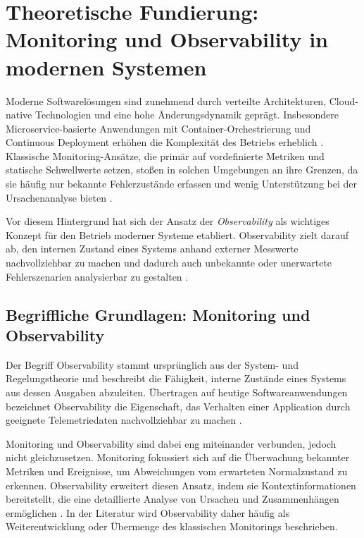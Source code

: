 \section{Theoretische Fundierung: Monitoring und Observability in modernen Systemen}

Moderne Softwarelösungen sind zunehmend durch verteilte Architekturen, Cloud-native Technologien und eine hohe Änderungsdynamik geprägt. Insbesondere Microservice-basierte Anwendungen mit Container-Orchestrierung und Continuous Deployment erhöhen die Komplexität des Betriebs erheblich \cite{sakinala2025observability}. Klassische Monitoring-Ansätze, die primär auf vordefinierte Metriken und statische Schwellwerte setzen, stoßen in solchen Umgebungen an ihre Grenzen, da sie häufig nur bekannte Fehlerzustände erfassen und wenig Unterstützung bei der Ursachenanalyse bieten \cite{sridharan2018distributed}.

Vor diesem Hintergrund hat sich der Ansatz der \emph{Observability} als wichtiges Konzept für den Betrieb moderner Systeme etabliert. Observability zielt darauf ab, den internen Zustand eines Systems anhand externer Messwerte nachvollziehbar zu machen und dadurch auch unbekannte oder unerwartete Fehlerszenarien analysierbar zu gestalten \cite{abieba2025advanced}.

\subsection{Begriffliche Grundlagen: Monitoring und Observability}

Der Begriff Observability stammt ursprünglich aus der System- und Regelungstheorie und beschreibt die Fähigkeit, interne Zustände eines Systems aus dessen Ausgaben abzuleiten. Übertragen auf heutige Softwareanwendungen bezeichnet Observability die Eigenschaft, das Verhalten einer Application durch geeignete Telemetriedaten nachvollziehbar zu machen \cite{sridharan2018distributed}. 

Monitoring und Observability sind dabei eng miteinander verbunden, jedoch nicht gleichzusetzen. Monitoring fokussiert sich auf die Überwachung bekannter Metriken und Ereignisse, um Abweichungen vom erwarteten Normalzustand zu erkennen. Observability erweitert diesen Ansatz, indem sie Kontextinformationen bereitstellt, die eine detaillierte Analyse von Ursachen und Zusammenhängen ermöglichen \cite{faseeha2025observability}. In der Literatur wird Observability daher häufig als Weiterentwicklung oder Übermenge des klassischen Monitorings beschrieben.

